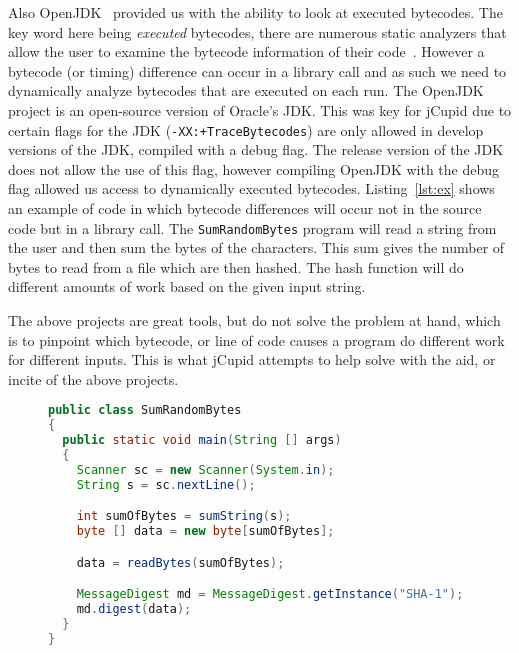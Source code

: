 Also OpenJDK~\cite{OpenJDK} provided us with the ability to look at executed
bytecodes. The key word here being \emph{executed} bytecodes, there are numerous
static analyzers that allow the user to examine the bytecode information of
their code~\cite{vallee1999soot}. However a bytecode (or timing) difference can
occur in a library call and as such we need to dynamically analyze bytecodes
that are executed on each run. The OpenJDK project is an open-source version of
Oracle's JDK. This was key for jCupid due to certain flags for the JDK
(\texttt{-XX:+TraceBytecodes}) are only allowed in develop versions of the JDK,
compiled with a debug flag. The release version of the JDK does not allow the
use of this flag, however compiling OpenJDK with the debug flag allowed us
access to dynamically executed bytecodes. Listing~\ref{lst:ex} shows an example
of code in which bytecode differences will occur not in the source code but in a
library call. The \texttt{SumRandomBytes} program will read a string from the
user and then sum the bytes of the characters. This sum gives the number of
bytes to read from a file which are then hashed. The hash function will do
different amounts of work based on the given input string. 

The above projects are great tools, but do not solve the problem at hand, which
is to pinpoint which bytecode, or line of code causes a program do different
work for different inputs. This is what jCupid attempts to help solve with the
aid, or incite of the above projects. 

\begin{figure}[t]
  \begin{center}
    \begin{lstlisting}[caption={Example of code with bytecode difference in
    library call},label={lst:ex},language=Java] 
public class SumRandomBytes
{
  public static void main(String [] args)
  {
    Scanner sc = new Scanner(System.in);
    String s = sc.nextLine();

    int sumOfBytes = sumString(s);
    byte [] data = new byte[sumOfBytes];

    data = readBytes(sumOfBytes);

    MessageDigest md = MessageDigest.getInstance("SHA-1");
    md.digest(data);
  }
}
    \end{lstlisting}
  \end{center}
\end{figure}
